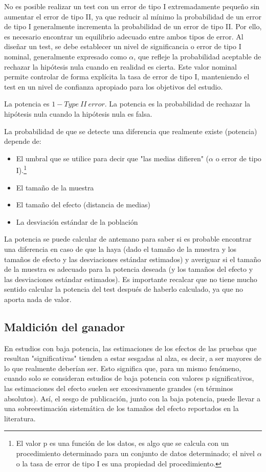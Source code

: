 \documentclass{config/apuntes}\usepackage[]{graphicx}\usepackage[]{xcolor}
\begin{document}
No es posible realizar un test con un error de tipo I extremadamente pequeño sin aumentar el error de tipo II, ya que reducir al mínimo la probabilidad de un error de tipo I generalmente incrementa la probabilidad de un error de tipo II. Por ello, es necesario encontrar un equilibrio adecuado entre ambos tipos de error. Al diseñar un test, se debe establecer un nivel de significancia o error de tipo I nominal, generalmente expresado como $\alpha$, que refleje la probabilidad aceptable de rechazar la hipótesis nula cuando en realidad es cierta. Este valor nominal permite controlar de forma explícita la tasa de error de tipo I, manteniendo el test en un nivel de confianza apropiado para los objetivos del estudio.

La potencia es $1 - Type\ II\ error$. La potencia es la probabilidad de rechazar la hipótesis nula cuando la hipótesis nula es falsa.

La probabilidad de que se detecte una diferencia que realmente existe (potencia) depende de:
\begin{itemize}
\item El umbral que se utilice para decir que "las medias difieren" ($\alpha$ o error de tipo I).\footnote{El valor p es una función de los datos, es algo que se calcula con un procedimiento determinado para un conjunto de datos determinado; el nivel $\alpha$ o la tasa de error de tipo I es una propiedad del procedimiento.}
\item El tamaño de la muestra
\item El tamaño del efecto (distancia de medias)
\item La desviación estándar de la población
\end{itemize}

La potencia se puede calcular de antemano para saber si es probable encontrar una diferencia en caso de que la haya (dado el tamaño de la muestra y los tamaños de efecto y las desviaciones estándar estimados) y averiguar si el tamaño de la muestra es adecuado para la potencia deseada (y los tamaños del efecto y las desviaciones estándar estimados). Es importante recalcar que no tiene mucho sentido calcular la potencia del test después de haberlo calculado, ya que no aporta nada de valor.

\subsection{Maldición del ganador}
En estudios con baja potencia, las estimaciones de los efectos de las pruebas que resultan "significativas" tienden a estar sesgadas al alza, es decir, a ser mayores de lo que realmente deberían ser. Esto significa que, para un mismo fenómeno, cuando solo se consideran estudios de baja potencia con valores p significativos, las estimaciones del efecto suelen ser excesivamente grandes (en términos absolutos). Así, el sesgo de publicación, junto con la baja potencia, puede llevar a una sobreestimación sistemática de los tamaños del efecto reportados en la literatura.
\end{document}
